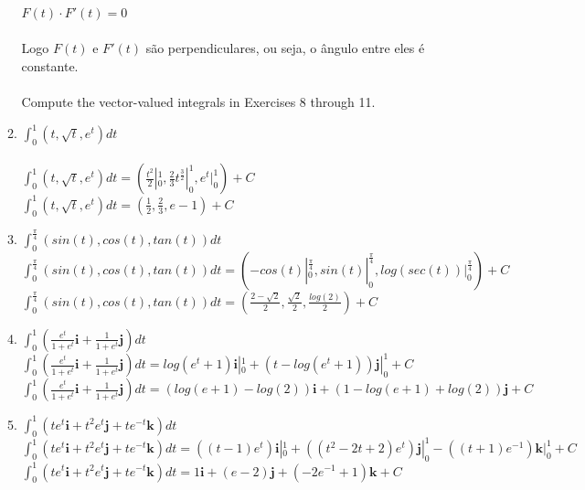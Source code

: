\documentclass{article}
\begin{document}
\begin{enumerate}
\begin{enumerate}[label=1.\arabic*.]
                $F(t) \cdot F'(t) = 0$ \\
                \\
                Logo $F(t)$ e $F'(t)$ são perpendiculares, ou seja, o ângulo entre eles é constante. \\
                \\
            Compute the vector-valued integrals in Exercises 8 through 11. \
            \item $\int_{0}^{1} (t, \sqrt{t}, e^t)dt$ \\
                \\
                 $\int_{0}^{1} (t, \sqrt{t}, e^t)dt = (\frac{t^2}{2}|_{0}^{1}, \frac{2}{3}t^{\frac{3}{2}}|_{0}^{1}, e^t|_{0}^{1}) + C$ \\
                 $\int_{0}^{1} (t, \sqrt{t}, e^t)dt = (\frac{1}{2}, \frac{2}{3}, e - 1) + C$ \\
            \item $\int_{0}^{\frac{\pi}{4}} (sin(t), cos(t), tan(t))dt$ \
                \\
                $\int_{0}^{\frac{\pi}{4}} (sin(t), cos(t), tan(t))dt = (-cos(t)|_{0}^{\frac{\pi}{4}}, sin(t)|_{0}^{\frac{\pi}{4}}, log(sec(t))|_{0}^{\frac{\pi}{4}}) + C$ \\
                $\int_{0}^{\frac{\pi}{4}} (sin(t), cos(t), tan(t))dt = (\frac{2-\sqrt{2}}{2}, \frac{\sqrt{2}}{2}, \frac{log(2)}{2}) + C$ \\
            \item $\int_{0}^{1} (\frac{e^t}{1+e^t}\textbf{i} + \frac{1}{1+e^t}\textbf{j})dt$ \
                \\
                $\int_{0}^{1} (\frac{e^t}{1+e^t}\textbf{i} + \frac{1}{1+e^t}\textbf{j})dt = log(e^t+1)\textbf{i}|_{0}^{1} + (t-log(e^t+1))\textbf{j}|_{0}^{1} + C$\\
                $\int_{0}^{1} (\frac{e^t}{1+e^t}\textbf{i} + \frac{1}{1+e^t}\textbf{j})dt = (log(e+1) - log(2))\textbf{i} + (1 - log(e+1) + log(2))\textbf{j} + C$\\
            \item $\int_{0}^{1} (te^t\textbf{i} + t^2e^t\textbf{j} + te^{-t}\textbf{k})dt$ \\
                $\int_{0}^{1} (te^t\textbf{i} + t^2e^t\textbf{j} + te^{-t}\textbf{k})dt = ((t-1)e^t)\textbf{i}|_{0}^{1} + ((t^2-2t+2)e^t)\textbf{j}|_{0}^{1} - ((t+1)e^{-1})\textbf{k}|_{0}^{1} + C$\\
                $\int_{0}^{1} (te^t\textbf{i} + t^2e^t\textbf{j} + te^{-t}\textbf{k})dt = 1\textbf{i} + (e - 2)\textbf{j} + (-2e^{-1} + 1)\textbf{k} + C$ \\

\end{enumerate}
\end{enumerate}
\end{document}
